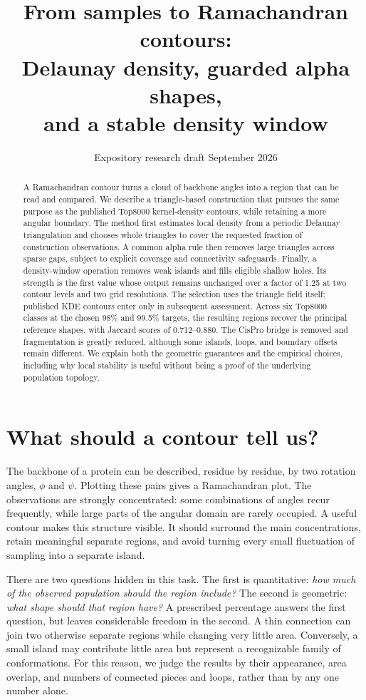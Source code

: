 \documentclass[11pt]{article}
\title{From samples to Ramachandran contours:\\
  Delaunay density, guarded alpha shapes,\\and a stable density window}
\author{}
\date{Expository research draft\quad\textbullet\quad 24 September 2026}
\begin{document}
\maketitle
\begin{abstract}
A Ramachandran contour turns a cloud of backbone angles into a region that can
be read and compared. We describe a triangle-based construction that pursues
the same purpose as the published Top8000 kernel-density contours, while
retaining a more angular boundary. The method first estimates local density
from a periodic Delaunay triangulation and chooses whole triangles to cover
the requested fraction of construction observations. A common alpha rule then
removes large triangles across sparse gaps, subject to explicit coverage and
connectivity safeguards. Finally, a density-window operation removes weak
islands and fills eligible shallow holes. Its strength is the first value
whose output remains unchanged over a factor of 1.25 at two contour levels
and two grid resolutions. The selection uses the triangle field itself;
published KDE contours enter only in subsequent assessment. Across six
Top8000 classes at the chosen 98\% and 99.5\% targets, the resulting regions
recover the principal reference shapes, with Jaccard scores of 0.712--0.880.
The CisPro bridge is removed and fragmentation is greatly reduced, although
some islands, loops, and boundary offsets remain different. We explain both
the geometric guarantees and the empirical choices, including why local
stability is useful without being a proof of the underlying population topology.
\end{abstract}

\section{What should a contour tell us?}
\label{sec:motivation}

The backbone of a protein can be described, residue by residue, by two
rotation angles, $\phi$ and $\psi$. Plotting these pairs gives a Ramachandran
plot. The observations are strongly concentrated: some combinations of
angles recur frequently, while large parts of the angular domain are rarely
occupied. A useful contour makes this structure visible. It should surround
the main concentrations, retain meaningful separate regions, and avoid
turning every small fluctuation of sampling into a separate island.

There are two questions hidden in this task. The first is quantitative:
\emph{how much of the observed population should the region include?} The
second is geometric: \emph{what shape should that region have?} A prescribed
percentage answers the first question, but leaves considerable freedom in
the second. A thin connection can join two otherwise separate regions while
changing very little area. Conversely, a small island may contribute little
area but represent a recognizable family of conformations. For this reason,
we judge the results by their appearance, area overlap, and numbers of
connected pieces and loops, rather than by any one number alone.
\end{document}
